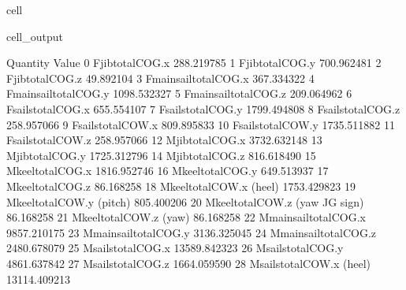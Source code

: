 \documentclass[letterpaper,10pt,english]{jupyterBook}
\begin{document}
\begin{sphinxuseclass}{cell}
\begin{sphinxVerbatimOutput}
\begin{sphinxuseclass}{cell_output}
\begin{sphinxVerbatim}[commandchars=\\\{\}]
                               Quantity         Value
0                     F\PYGZus{}jib\PYGZus{}total\PYGZus{}COG.x   \PYGZhy{}288.219785
1                     F\PYGZus{}jib\PYGZus{}total\PYGZus{}COG.y    700.962481
2                     F\PYGZus{}jib\PYGZus{}total\PYGZus{}COG.z    \PYGZhy{}49.892104
3               F\PYGZus{}main\PYGZus{}sail\PYGZus{}total\PYGZus{}COG.x   \PYGZhy{}367.334322
4               F\PYGZus{}main\PYGZus{}sail\PYGZus{}total\PYGZus{}COG.y   1098.532327
5               F\PYGZus{}main\PYGZus{}sail\PYGZus{}total\PYGZus{}COG.z   \PYGZhy{}209.064962
6                   F\PYGZus{}sails\PYGZus{}total\PYGZus{}COG.x   \PYGZhy{}655.554107
7                   F\PYGZus{}sails\PYGZus{}total\PYGZus{}COG.y   1799.494808
8                   F\PYGZus{}sails\PYGZus{}total\PYGZus{}COG.z   \PYGZhy{}258.957066
9                   F\PYGZus{}sails\PYGZus{}total\PYGZus{}COW.x   \PYGZhy{}809.895833
10                  F\PYGZus{}sails\PYGZus{}total\PYGZus{}COW.y   1735.511882
11                  F\PYGZus{}sails\PYGZus{}total\PYGZus{}COW.z   \PYGZhy{}258.957066
12                    M\PYGZus{}jib\PYGZus{}total\PYGZus{}COG.x  \PYGZhy{}3732.632148
13                    M\PYGZus{}jib\PYGZus{}total\PYGZus{}COG.y  \PYGZhy{}1725.312796
14                    M\PYGZus{}jib\PYGZus{}total\PYGZus{}COG.z   \PYGZhy{}816.618490
15                   M\PYGZus{}keel\PYGZus{}total\PYGZus{}COG.x  \PYGZhy{}1816.952746
16                   M\PYGZus{}keel\PYGZus{}total\PYGZus{}COG.y   \PYGZhy{}649.513937
17                   M\PYGZus{}keel\PYGZus{}total\PYGZus{}COG.z     86.168258
18            M\PYGZus{}keel\PYGZus{}total\PYGZus{}COW.x (heel)  \PYGZhy{}1753.429823
19           M\PYGZus{}keel\PYGZus{}total\PYGZus{}COW.y (pitch)   \PYGZhy{}805.400206
20   M\PYGZus{}keel\PYGZus{}total\PYGZus{}COW.z (yaw \PYGZhy{} JG sign)    \PYGZhy{}86.168258
21             M\PYGZus{}keel\PYGZus{}total\PYGZus{}COW.z (yaw)     86.168258
22              M\PYGZus{}main\PYGZus{}sail\PYGZus{}total\PYGZus{}COG.x  \PYGZhy{}9857.210175
23              M\PYGZus{}main\PYGZus{}sail\PYGZus{}total\PYGZus{}COG.y  \PYGZhy{}3136.325045
24              M\PYGZus{}main\PYGZus{}sail\PYGZus{}total\PYGZus{}COG.z   2480.678079
25                  M\PYGZus{}sails\PYGZus{}total\PYGZus{}COG.x \PYGZhy{}13589.842323
26                  M\PYGZus{}sails\PYGZus{}total\PYGZus{}COG.y  \PYGZhy{}4861.637842
27                  M\PYGZus{}sails\PYGZus{}total\PYGZus{}COG.z   1664.059590
28           M\PYGZus{}sails\PYGZus{}total\PYGZus{}COW.x (heel) \PYGZhy{}13114.409213

\end{sphinxVerbatim}
\end{sphinxuseclass}
\end{sphinxVerbatimOutput}
\end{sphinxuseclass}
\end{document}
